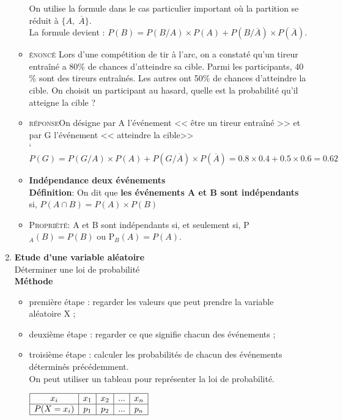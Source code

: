 \begin{enumerate}
\begin{itemize}[label=\bf $ \ast $]
On utilise la formule dans le cas particulier important où la partition se réduit à $ \{ A,\; \overline{A} \}. $\\
La formule devient :\; $P ( B ) = P ( B / A ) \times P ( A ) + P ( B / \overline{A} ) \times P ( \overline{A}) $.
\item\textsc{énoncé}\; Lors d'une compétition de tir à l'arc, on a constaté qu'un tireur entraîné a 80\% de chances d'atteindre sa cible. Parmi les
participants, 40 \% sont des tireurs entraînés. Les autres ont 50\% de chances d'atteindre la cible. On choisit un participant au hasard,
quelle est la probabilité qu'il atteigne la cible ?
\item \textsc{réponse}\;On désigne par A l'événement << être un tireur entraîné >> et par G l'événement << atteindre la cible>>\\`
$ P(G)=P ( G / A ) \times P ( A ) + P ( G / \overline{A} ) \times P ( \overline{A})=0.8\times 0.4+0.5\times0.6=0.62 $
\item \textbf{Indépendance deux événements}\\
 \textbf{Définition}:\quad
On dit que \textbf {les événements A et B sont indépendants} si,\quad 
$ P(A\cap B)= P(A)\times  P(B)$
\item\textsc{Propriété}:\;
A et B sont indépendants si, et seulement si, P$_{A}(B)=P(B) $\; ou\; P$ _{B}(A)=P(A) $.

\end{itemize}
\item \textbf{Etude d'une variable aléatoire}\\
Déterminer une loi de probabilité\\
\textbf{Méthode}
\begin{itemize}[label=\bf $ \bullet $]
\item première étape : regarder les valeurs que peut prendre la variable aléatoire X ;
\item deuxième étape : regarder ce que signifie chacun des événements ;
\item  troisième étape : calculer les probabilités de chacun des événements déterminés précédemment.\\
On peut utiliser un tableau  pour représenter la loi de probabilité.

 $\begin{array}{|c|c|c|c|c|c|}
\hline
  x_{i} &  x_1 &  x_2 & ... &  x_n \\
\hline
 P(X=x_{i})  &  p_1 &  p_2    & ...&  p_n \\
\hline
\end{array}$


\end{itemize}
\end{enumerate}
